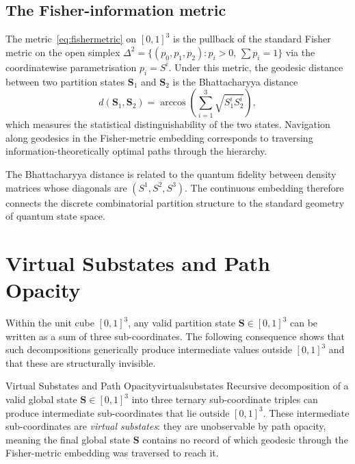 \subsection{The Fisher-information metric}
\label{subsec:fishermetric}

The metric~\eqref{eq:fishermetric} on $[0,1]^{3}$ is the pullback of the
standard Fisher metric on the open simplex
$\Delta^{2}=\{(p_{0},p_{1},p_{2}):p_{i}>0,\,\sum p_{i}=1\}$ via the
coordinatewise parametrisation $p_{i}=S^{i}$.  Under this metric, the
geodesic distance between two partition states $\mathbf{S}_{1}$ and
$\mathbf{S}_{2}$ is the Bhattacharyya distance
\[
  d(\mathbf{S}_{1},\mathbf{S}_{2})
  = \arccos\!\left(\sum_{i=1}^{3}\sqrt{S^{i}_{1}S^{i}_{2}}\right),
\]
which measures the statistical distinguishability of the two states.
Navigation along geodesics in the Fisher-metric embedding corresponds to
traversing information-theoretically optimal paths through the hierarchy.

\begin{remark}
The Bhattacharyya distance is related to the quantum fidelity between density
matrices whose diagonals are $(S^{1},S^{2},S^{3})$.  The continuous embedding
therefore connects the discrete combinatorial partition structure to the
standard geometry of quantum state space.
\end{remark}

\section{Virtual Substates and Path Opacity}
\label{sec:virtualsubstates}

Within the unit cube $[0,1]^{3}$, any valid partition state
$\mathbf{S}\in[0,1]^{3}$ can be written as a sum of three sub-coordinates.
The following consequence shows that such decompositions generically produce
intermediate values outside $[0,1]^{3}$ and that these are structurally
invisible.

\begin{consequence}{Virtual Substates and Path Opacity}{virtualsubstates}
Recursive decomposition of a valid global state $\mathbf{S}\in[0,1]^{3}$
into three ternary sub-coordinate triples can produce intermediate
sub-coordinates that lie outside $[0,1]^{3}$.  These intermediate
sub-coordinates are \emph{virtual substates}: they are unobservable by path
opacity, meaning the final global state $\mathbf{S}$ contains no record of
which geodesic through the Fisher-metric embedding was traversed to reach it.
\end{consequence}


